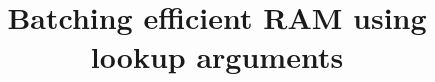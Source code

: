 \documentclass[sigconf]{acmart}
\begin{document}
	
	\title{Batching efficient RAM using lookup arguments}
	
%	
%	
%	
%	
%	
%	
%	
%	
	
\end{document}
